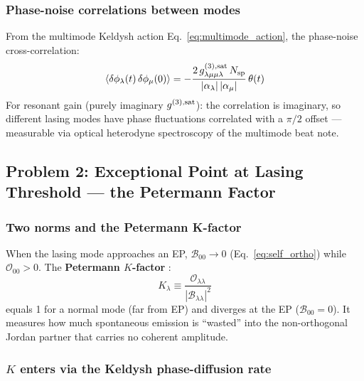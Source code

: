 \documentclass[12pt]{article}
\begin{document}
\subsubsection*{Phase-noise correlations between modes}

From the multimode Keldysh action Eq.~\eqref{eq:multimode_action}, the
phase-noise cross-correlation:
\begin{equation}
  \langle\delta\phi_\lambda(t)\,\delta\phi_\mu(0)\rangle =
  -\frac{2\,g^{(3),\rm sat}_{\lambda\mu\mu\lambda}\,N_{\rm sp}}
  {|\alpha_\lambda|\,|\alpha_\mu|}\,\theta(t)
  \label{eq:phase_correlation}
\end{equation}
For resonant gain (purely imaginary $g^{(3),\rm sat}$): the correlation
is imaginary, so different lasing modes have phase fluctuations
correlated with a $\pi/2$ offset --- measurable via optical heterodyne
spectroscopy of the multimode beat note.

\subsection{Problem 2: Exceptional Point at Lasing Threshold ---
the Petermann Factor}
\label{sec:EP_threshold}

\subsubsection*{Two norms and the Petermann K-factor}

When the lasing mode approaches an EP, $\mathcal{B}_{00}\to 0$
(Eq.~\ref{eq:self_ortho}) while $\mathcal{O}_{00}>0$.
The \textbf{Petermann $K$-factor} \cite{Petermann1979,Siegman1989}:
\begin{equation}
  K_\lambda \equiv
  \frac{\mathcal{O}_{\lambda\lambda}}{|\mathcal{B}_{\lambda\lambda}|^2}
  \label{eq:petermann}
\end{equation}
equals 1 for a normal mode (far from EP) and diverges at the EP
($\mathcal{B}_{00}=0$).  It measures how much spontaneous emission is
``wasted'' into the non-orthogonal Jordan partner that carries no
coherent amplitude.

\subsubsection*{$K$ enters via the Keldysh phase-diffusion rate}
\end{document}
